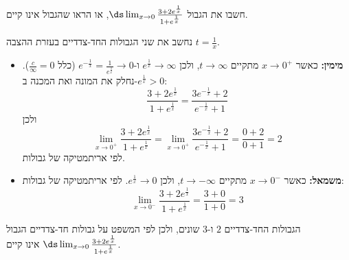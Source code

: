 חשבו את הגבול $\ds\lim_{x\to0}\frac{3+2e^{\frac1x}}{1+e^{\frac1x}}$, או הראו שהגבול אינו קיים.
\ifsol
{}
\begin{solbox}
נחשב את שני הגבולות החד-צדדיים בעזרת ההצבה $t=\frac1x$.
\begin{itemize}
\item \textbf{מימין:} כאשר $x\to0^+$ מתקיים $t\to\infty$, ולכן $e^{\frac1x}\to\infty$ ו-$e^{-\frac1x}=\frac{1}{e^{\frac1x}}\to0$ (כלל $\frac{c}{\infty}=0$). נחלק את המונה ואת המכנה ב-$e^{\frac1x}>0$:
\[\frac{3+2e^{\frac1x}}{1+e^{\frac1x}}=\frac{3e^{-\frac1x}+2}{e^{-\frac1x}+1}\]
ולכן
\[\lim_{x\to0^+}\frac{3+2e^{\frac1x}}{1+e^{\frac1x}}=\lim_{x\to0^+}\frac{3e^{-\frac1x}+2}{e^{-\frac1x}+1}=\frac{0+2}{0+1}=2\]
לפי אריתמטיקה של גבולות.
\item \textbf{משמאל:} כאשר $x\to0^-$ מתקיים $t\to-\infty$, ולכן $e^{\frac1x}\to0$. לפי אריתמטיקה של גבולות:
\[\lim_{x\to0^-}\frac{3+2e^{\frac1x}}{1+e^{\frac1x}}=\frac{3+0}{1+0}=3\]
\end{itemize}
הגבולות החד-צדדיים $2$ ו-$3$ שונים, ולכן לפי המשפט על גבולות חד-צדדיים הגבול $\ds\lim_{x\to0}\frac{3+2e^{\frac1x}}{1+e^{\frac1x}}$ אינו קיים.
\end{solbox}
\fi
